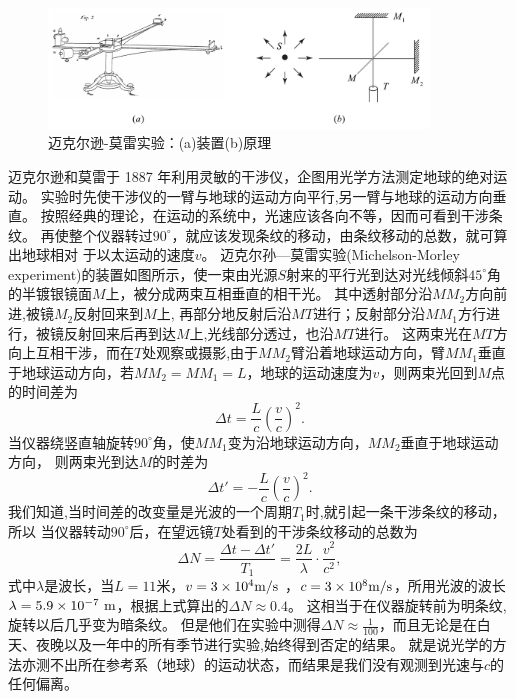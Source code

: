 \begin{figure}[htb]
\centering
\includegraphics[width=0.9\textwidth]{images/relativity-5.pdf}
\caption{迈克尔逊-莫雷实验：(a)装置(b)原理}
\label{fig: relativity-5}
\end{figure}

迈克尔逊和莫雷于 1887 年利用灵敏的干涉仪，企图用光学方法测定地球的绝对运动。
实验时先使干涉仪的一臂与地球的运动方向平行,另一臂与地球的运动方向垂直。
按照经典的理论，在运动的系统中，光速应该各向不等，因而可看到干涉条纹。
再使整个仪器转过$90^\circ$，就应该发现条纹的移动，由条纹移动的总数，就可算出地球相对
于以太运动的速度$v$。
{\heiti 迈克尔孙—莫雷实验}(Michelson-Morley experiment)的装置如图所示，使一束由光源$ S $射来的平行光到达对光线倾斜$45^\circ$角的半镀银镜面$ M $上，被分成两束互相垂直的相干光。
其中透射部分沿$MM_2 $方向前进,被镜$ M_2 $反射回来到$ M $上, 再部分地反射后沿$ MT $进行；反射部分沿$ MM_1 $方行进行，被镜反射回来后再到达$M $上,光线部分透过，也沿$ MT $进行。
这两束光在$ MT $方向上互相干涉，而在$ T $处观察或摄影,由于$ MM_2$臂沿着地球运动方向，臂$MM_1$垂直于地球运动方向，若$MM_2= MM_1=L$，地球的运动速度为$ v$，则两束光回到$ M $点的时间差为
\[
\Delta t = \frac{L}{c}\left(  \frac{v}{c}\right)^2.
\]
当仪器绕竖直轴旋转$ 90^\circ $角，使$MM_1$变为沿地球运动方向，$MM_2$垂直于地球运动方向， 则两束光到达$ M $的时差为
\[
\Delta t' = -\frac{L}{c}\left(  \frac{v}{c}\right)^2.
\]
我们知道,当时间差的改变量是光波的一个周期$ T_1 $时,就引起一条干涉条纹的移动，所以
当仪器转动$90^\circ $后，在望远镜$ T $处看到的干涉条纹移动的总数为
\begin{equation}
\Delta N = \frac{ \Delta t- \Delta t'}{T_1} = \frac{2L}{ 	\lambda}\cdot \frac{v^2}{c^2},
\end{equation}
式中$ \lambda$是波长，当$ L=11 $米，$ v = 3\times 10^{4}{\rm{m/s}}$ ，$ c = 3\times 10^{8}{\rm{m/s}}$，所用光波的波长$ \lambda = 5.9\times 10^{-7}~\text{m}$，根据上式算出的$ \Delta N  \approx 0.4$。
这相当于在仪器旋转前为明条纹,旋转以后几乎变为暗条纹。
但是他们在实验中测得$ \Delta N \approx \frac{1}{100}$，而且无论是在白天、夜晚以及一年中的所有季节进行实验,始终得到否定的结果。
就是说光学的方法亦测不出所在参考系（地球）的运动状态，而结果是我们没有观测到光速与$c$的任何偏离。

